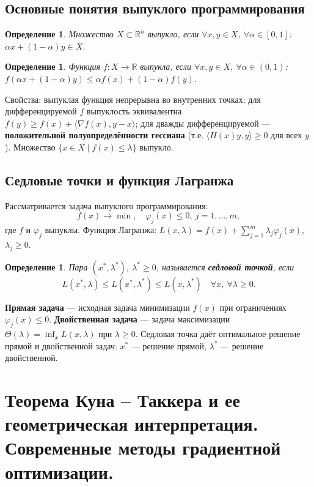 \documentclass{article}
\theoremstyle{plain}
\newtheorem{definition}[theorem]{Определение}
\begin{document}
\subsection{Основные понятия выпуклого программирования}
\begin{definition}
Множество $X \subset \mathbb{R}^n$ выпукло, если $\forall x,y \in X$, $\forall \alpha \in [0,1]$: $\alpha x + (1-\alpha)y \in X$.
\end{definition}
\begin{definition}
Функция $f: X \to \mathbb{R}$ выпукла, если $\forall x,y \in X$, $\forall \alpha \in (0,1)$: $f(\alpha x + (1-\alpha)y) \le \alpha f(x) + (1-\alpha) f(y)$.
\end{definition}
Свойства: выпуклая функция непрерывна во внутренних точках; для дифференцируемой $f$ выпуклость эквивалентна $f(y) \ge f(x) + \langle \nabla f(x), y-x \rangle$; для дважды дифференцируемой — \textbf{положительной полуопределённости гессиана} (т.е. $\langle H(x) y, y \rangle \ge 0$ для всех $y$). Множество $\{x \in X \mid f(x) \le \lambda\}$ выпукло.

\subsection{Седловые точки и функция Лагранжа}
Рассматривается задача выпуклого программирования:
\[
f(x) \to \min,\quad \varphi_j(x) \le 0,\ j=1,\dots,m,
\]
где $f$ и $\varphi_j$ выпуклы.
Функция Лагранжа: $L(x, \lambda) = f(x) + \sum_{j=1}^m \lambda_j \varphi_j(x)$, $\lambda_j \ge 0$.

\begin{definition}
Пара $(x^*, \lambda^*)$, $\lambda^* \ge 0$, называется \textbf{седловой точкой}, если
\[
L(x^*, \lambda) \le L(x^*, \lambda^*) \le L(x, \lambda^*) \quad \forall x,\ \forall \lambda \ge 0.
\]
\end{definition}
\textbf{Прямая задача} — исходная задача минимизации $f(x)$ при ограничениях $\varphi_j(x)\le 0$. \textbf{Двойственная задача} — задача максимизации $\Theta(\lambda)=\inf_{x} L(x,\lambda)$ при $\lambda\ge 0$. Седловая точка даёт оптимальное решение прямой и двойственной задач: $x^*$ — решение прямой, $\lambda^*$ — решение двойственной.

\section{Теорема Куна – Таккера и ее геометрическая интерпретация. Современные методы градиентной оптимизации.}
\end{document}
